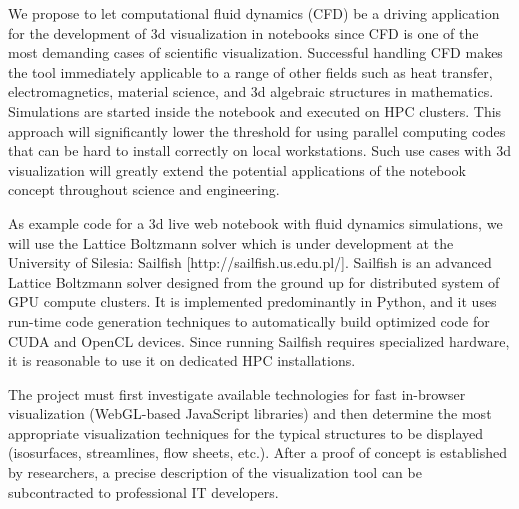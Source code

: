 \begin{workpackage}
\begin{tasklist}
\begin{task}[title=Visualization system for 3d data in web-notebook
, id=cfd-vis]
We propose to let computational fluid dynamics (CFD) be a driving
application for the development of 3d visualization in \Jupyter
notebooks since CFD is one of the most demanding cases of scientific
visualization. Successful handling CFD makes the tool immediately
applicable to a range of other fields such as heat transfer,
electromagnetics, material science, and 3d algebraic structures in
mathematics. Simulations are started inside the notebook and executed
on HPC clusters. This approach will significantly lower the threshold
for using parallel computing codes that can be hard to install
correctly on local workstations. Such use cases with 3d visualization
will greatly extend the potential applications of the \Jupyter
notebook concept throughout science and engineering.

As example code for a 3d live web notebook with fluid dynamics
simulations, we will use the Lattice Boltzmann solver which is under
development at the University of Silesia: Sailfish
[http://sailfish.us.edu.pl/].  Sailfish is an advanced Lattice
Boltzmann solver designed from the ground up for distributed system of
GPU compute clusters. It is implemented predominantly in Python, and
it uses run-time code generation techniques to automatically build
optimized code for CUDA and OpenCL devices. Since running Sailfish
requires specialized hardware, it is reasonable to use it on dedicated
HPC installations.

The project must first investigate available technologies for fast
in-browser visualization (WebGL-based JavaScript libraries) and then
determine the most appropriate visualization techniques for the
typical structures to be displayed (isosurfaces, streamlines, flow
sheets, etc.).  After a proof of concept is established by
researchers, a precise description of the visualization tool can be
subcontracted to professional IT developers.

\end{task}


\begin{task}[id=mws,title=Math Search Engine,lead=JU,PM=10]
\end{task}


\end{tasklist}
\end{workpackage}

